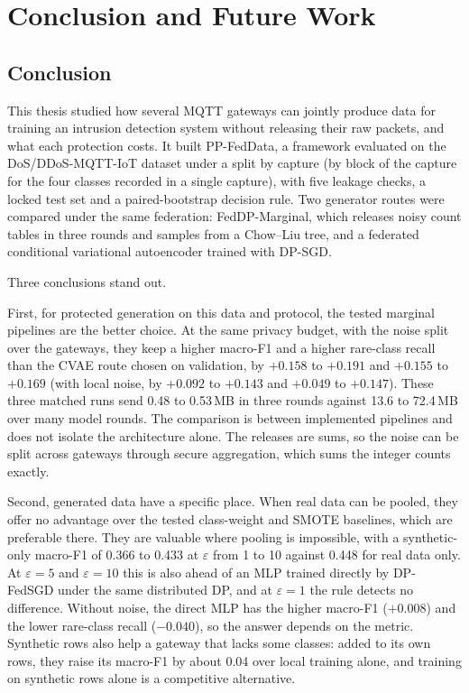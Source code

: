 \chapter{Conclusion and Future Work}\label{chap:conclusion}

\section{Conclusion}

This thesis studied how several MQTT gateways can jointly produce data for training an intrusion detection system without releasing their raw packets, and what each protection costs. It built PP-FedData, a framework evaluated on the DoS/DDoS-MQTT-IoT dataset under a split by capture (by block of the capture for the four classes recorded in a single capture), with five leakage checks, a locked test set and a paired-bootstrap decision rule. Two generator routes were compared under the same federation: FedDP-Marginal, which releases noisy count tables in three rounds and samples from a Chow--Liu tree, and a federated conditional variational autoencoder trained with DP-SGD.

Three conclusions stand out.

First, for protected generation on this data and protocol, the tested marginal pipelines are the better choice. At the same privacy budget, with the noise split over the gateways, they keep a higher macro-F1 and a higher rare-class recall than the CVAE route chosen on validation, by $+0.158$ to $+0.191$ and $+0.155$ to $+0.169$ (with local noise, by $+0.092$ to $+0.143$ and $+0.049$ to $+0.147$). These three matched runs send 0.48 to 0.53\,MB in three rounds against 13.6 to 72.4\,MB over many model rounds. The comparison is between implemented pipelines and does not isolate the architecture alone. The releases are sums, so the noise can be split across gateways through secure aggregation, which sums the integer counts exactly.

Second, generated data have a specific place. When real data can be pooled, they offer no advantage over the tested class-weight and SMOTE baselines, which are preferable there. They are valuable where pooling is impossible, with a synthetic-only macro-F1 of 0.366 to 0.433 at $\varepsilon$ from 1 to 10 against 0.448 for real data only. At $\varepsilon = 5$ and $\varepsilon = 10$ this is also ahead of an MLP trained directly by DP-FedSGD under the same distributed DP, and at $\varepsilon = 1$ the rule detects no difference. Without noise, the direct MLP has the higher macro-F1 ($+0.008$) and the lower rare-class recall ($-0.040$), so the answer depends on the metric. Synthetic rows also help a gateway that lacks some classes: added to its own rows, they raise its macro-F1 by about 0.04 over local training alone, and training on synthetic rows alone is a competitive alternative.

